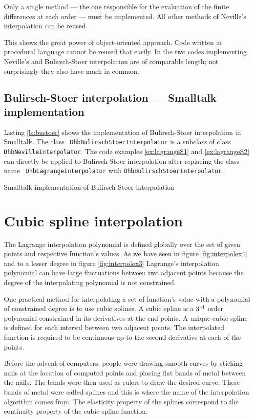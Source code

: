 \documentclass[twoside]{book}
\begin{document}
Only a single method --- the one responsible for the evaluation of
the finite differences at each order --- must be implemented. All
other methods of Neville's interpolation can be reused.

This shows the great power of object-oriented approach. Code
written in procedural language cannot be reused that easily. In
\cite{Press} the two codes implementing Neville's and
Bulirsch-Stoer interpolation are of comparable length; not
surprisingly they also have much in common.

\subsection{Bulirsch-Stoer interpolation --- Smalltalk implementation}
Listing \ref{ls:bustoer} shows the implementation of
Bulirsch-Stoer interpolation in Smalltalk. The class {\tt
DhbBulirschStoerInterpolator} is a subclass of class {\tt
DhbNevilleInterpolator}. The code examples \ref{ex:lagrangeS1} and
\ref{ex:lagrangeS2} can directly be applied to Bulirsch-Stoer
interpolation after replacing the class name {\tt
DhbLagrangeInterpolator} with {\tt DhbBulirschStoerInterpolator}.
\begin{listing}
  Smalltalk implementation of Bulirsch-Stoer interpolation
\label{ls:bustoer}

\end{listing}


\section{Cubic spline interpolation}
The Lagrange interpolation polynomial is defined globally over the
set of given points and respective function's values. As we have
seen in figure \ref{fig:interpolex4} and to a lesser degree in
figure \ref{fig:interpolex3} Lagrange's interpolation polynomial
can have large fluctuations between two adjacent points because
the degree of the interpolating polynomial is not constrained.

One practical method for interpolating a set of function's value
with a polynomial of constrained degree is to use cubic splines. A
cubic spline is a $3^{\mathop{\rm rd}}$ order polynomial
constrained in its derivatives at the end points. A unique cubic
spline is defined for each interval between two adjacent points.
The interpolated function is required to be continuous up to the
second derivative at each of the points.

Before the advent of computers, people were drawing smooth curves
by sticking nails at the location of computed points and placing
flat bands of metal between the nails. The bands were then used as
rulers to draw the desired curve. These bands of metal were called
splines and this is where the name of the interpolation algorithm
comes from. The elasticity property of the splines correspond to
the continuity property of the cubic spline function.
\end{document}
